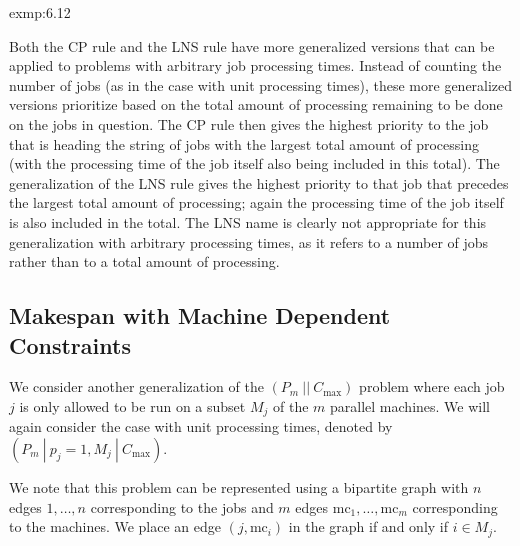 \begin{exmp}{exmp:6.12}
\begin{center}
    \end{center}
    \vspace{-0.4cm}
\end{exmp}

Both the CP rule and the LNS rule have more generalized versions that
can be applied to problems with arbitrary job processing times. Instead of
counting the number of jobs (as in the case with unit processing times), these
more generalized versions prioritize based on the total amount of processing
remaining to be done on the jobs in question. The CP rule then gives the
highest priority to the job that is heading the string of jobs with the largest
total amount of processing (with the processing time of the job itself also being
included in this total). The generalization of the LNS rule gives the highest
priority to that job that precedes the largest total amount of processing; again
the processing time of the job itself is also included in the total. The LNS name
is clearly not appropriate for this generalization with arbitrary processing times,
as it refers to a number of jobs rather than to a total amount of processing.

\subsection{Makespan with Machine Dependent Constraints} \label{subsec:6.3}
We consider another generalization of the $(P_m~||~C_{\max})$ problem 
where each job $j$ is only allowed to be run on a subset $M_j$ of the $m$ 
parallel machines. We will again consider the case with unit processing times, 
denoted by $(P_m~|~p_j=1, M_j~|~C_{\max})$. 

We note that this problem can be represented using a bipartite graph with $n$ 
edges $1, \dots, n$ corresponding to the jobs and $m$ edges $\text{mc}_1, 
\dots, \text{mc}_m$ corresponding to the machines. We place an edge 
$(j, \text{mc}_i)$ in the graph if and only if $i \in M_j$. 

